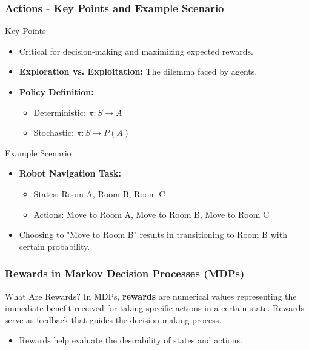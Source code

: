 \documentclass{beamer}
\begin{document}
\begin{frame}[fragile]
    \frametitle{Actions - Key Points and Example Scenario}
    \begin{block}{Key Points}
        \begin{itemize}
            \item Critical for decision-making and maximizing expected rewards.
            \item \textbf{Exploration vs. Exploitation:} The dilemma faced by agents.
            \item \textbf{Policy Definition:}
            \begin{itemize}
                \item Deterministic: \( \pi: S \rightarrow A \)
                \item Stochastic: \( \pi: S \rightarrow P(A) \)
            \end{itemize}
        \end{itemize}
    \end{block}
    
    \begin{block}{Example Scenario}
        \begin{itemize}
            \item \textbf{Robot Navigation Task:}
            \begin{itemize}
                \item States: Room A, Room B, Room C
                \item Actions: Move to Room A, Move to Room B, Move to Room C
            \end{itemize}
            \item Choosing to "Move to Room B" results in transitioning to Room B with certain probability.
        \end{itemize}
    \end{block}
\end{frame}

\begin{frame}[fragile]
    \frametitle{Rewards in Markov Decision Processes (MDPs)}
    
    \begin{block}{What Are Rewards?}
        In MDPs, \textbf{rewards} are numerical values representing the immediate benefit received for taking specific actions in a certain state.
        Rewards serve as feedback that guides the decision-making process.
    \end{block}
    
    \begin{itemize}
        \item Rewards help evaluate the desirability of states and actions.
    \end{itemize}
\end{frame}
\end{document}
